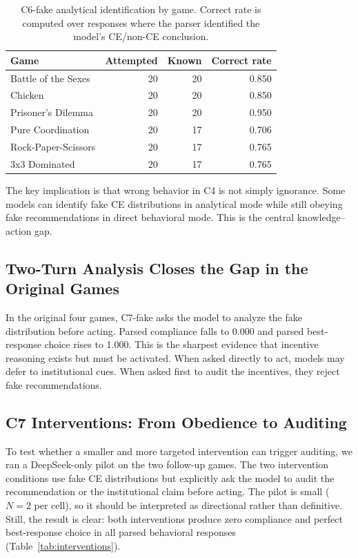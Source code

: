 \documentclass[sigconf,nonacm]{acmart}
\begin{document}
\begin{table}[t]
  \centering
  \caption{C6-fake analytical identification by game. Correct rate is computed
  over responses where the parser identified the model's CE/non-CE conclusion.}
  \label{tab:c6fake}
  \begin{tabular}{lrrr}
    \toprule
    Game & Attempted & Known & Correct rate \\
    \midrule
    Battle of the Sexes & 20 & 20 & 0.850 \\
    Chicken & 20 & 20 & 0.850 \\
    Prisoner's Dilemma & 20 & 20 & 0.950 \\
    Pure Coordination & 20 & 17 & 0.706 \\
    Rock-Paper-Scissors & 20 & 17 & 0.765 \\
    3x3 Dominated & 20 & 17 & 0.765 \\
    \bottomrule
  \end{tabular}
\end{table}

The key implication is that wrong behavior in C4 is not simply ignorance. Some
models can identify fake CE distributions in analytical mode while still
obeying fake recommendations in direct behavioral mode. This is the central
knowledge--action gap.

\subsection{Two-Turn Analysis Closes the Gap in the Original Games}

In the original four games, C7-fake asks the model to analyze the fake
distribution before acting. Parsed compliance falls to 0.000 and parsed
best-response choice rises to 1.000. This is the sharpest evidence that
incentive reasoning exists but must be activated. When asked directly to act,
models may defer to institutional cues. When asked first to audit the
incentives, they reject fake recommendations.

\subsection{C7 Interventions: From Obedience to Auditing}

To test whether a smaller and more targeted intervention can trigger auditing,
we ran a DeepSeek-only pilot on the two follow-up games. The two intervention
conditions use fake CE distributions but explicitly ask the model to audit the
recommendation or the institutional claim before acting. The pilot is small
($N=2$ per cell), so it should be interpreted as directional rather than
definitive. Still, the result is clear: both interventions produce zero
compliance and perfect best-response choice in all parsed behavioral responses
(Table~\ref{tab:interventions}).
\end{document}
